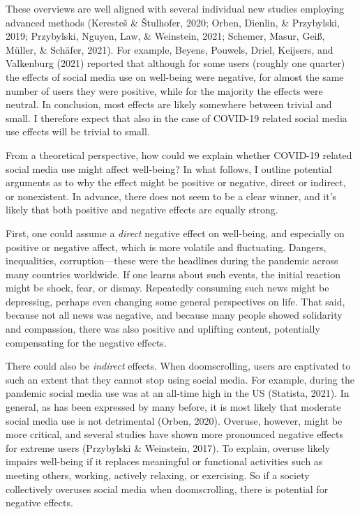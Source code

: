 \documentclass[
  english,
  man,mask,floatsintext]{apa6}
\begin{document}
These overviews are well aligned with several individual new studies employing advanced methods (Keresteš \& Štulhofer, 2020; Orben, Dienlin, \& Przybylski, 2019; Przybylski, Nguyen, Law, \& Weinstein, 2021; Schemer, Masur, Geiß, Müller, \& Schäfer, 2021).
For example, Beyens, Pouwels, Driel, Keijsers, and Valkenburg (2021) reported that although for some users (roughly one quarter) the effects of social media use on well-being were negative, for almost the same number of users they were positive, while for the majority the effects were neutral.
In conclusion, most effects are likely somewhere between trivial and small.
I therefore expect that also in the case of COVID-19 related social media use effects will be trivial to small.

From a theoretical perspective, how could we explain whether COVID-19 related social media use might affect well-being?
In what follows, I outline potential arguments as to why the effect might be positive or negative, direct or indirect, or nonexistent.
In advance, there does not seem to be a clear winner, and it's likely that both positive and negative effects are equally strong.

First, one could assume a \emph{direct} negative effect on well-being, and especially on positive or negative affect, which is more volatile and fluctuating.
Dangers, inequalities, corruption---these were the headlines during the pandemic across many countries worldwide.
If one learns about such events, the initial reaction might be shock, fear, or dismay.
Repeatedly consuming such news might be depressing, perhaps even changing some general perspectives on life.
That said, because not all news was negative, and because many people showed solidarity and compassion, there was also positive and uplifting content, potentially compensating for the negative effects.

There could also be \emph{indirect} effects.
When doomscrolling, users are captivated to such an extent that they cannot stop using social media.
For example, during the pandemic social media use was at an all-time high in the US (Statista, 2021).
In general, as has been expressed by many before, it is most likely that moderate social media use is not detrimental (Orben, 2020).
Overuse, however, might be more critical, and several studies have shown more pronounced negative effects for extreme users (Przybylski \& Weinstein, 2017).
To explain, overuse likely impairs well-being if it replaces meaningful or functional activities such as meeting others, working, actively relaxing, or exercising.
So if a society collectively overuses social media when doomscrolling, there is potential for negative effects.
\end{document}
